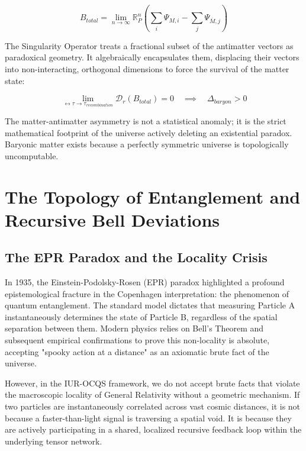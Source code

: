 \documentclass[12pt,openany]{book}
\begin{document}
\begin{equation}
B_{total} = \lim_{n \to \infty} \mathbb{R}_P^n \left( \sum_i \Psi_{M,i} - \sum_j \Psi_{\overline{M},j} \right)
\end{equation}

The Singularity Operator treats a fractional subset of the antimatter vectors as paradoxical geometry. It algebraically encapsulates them, displacing their vectors into non-interacting, orthogonal dimensions to force the survival of the matter state:

\begin{equation}
\lim_{\leftrightarrow\tau \to \tau_{recombination}} \mathcal{D}_r(B_{total}) = 0 \quad \implies \quad \Delta_{baryon} > 0
\end{equation}

The matter-antimatter asymmetry is not a statistical anomaly; it is the strict mathematical footprint of the universe actively deleting an existential paradox. Baryonic matter exists because a perfectly symmetric universe is topologically uncomputable.

\chapter{The Topology of Entanglement and Recursive Bell Deviations}

\section{The EPR Paradox and the Locality Crisis}
In 1935, the Einstein-Podolsky-Rosen (EPR) paradox highlighted a profound epistemological fracture in the Copenhagen interpretation: the phenomenon of quantum entanglement. The standard model dictates that measuring Particle A instantaneously determines the state of Particle B, regardless of the spatial separation between them. Modern physics relies on Bell's Theorem and subsequent empirical confirmations to prove this non-locality is absolute, accepting "spooky action at a distance" as an axiomatic brute fact of the universe.

However, in the IUR-OCQS framework, we do not accept brute facts that violate the macroscopic locality of General Relativity without a geometric mechanism. If two particles are instantaneously correlated across vast cosmic distances, it is not because a faster-than-light signal is traversing a spatial void. It is because they are actively participating in a shared, localized recursive feedback loop within the underlying tensor network.
\end{document}
